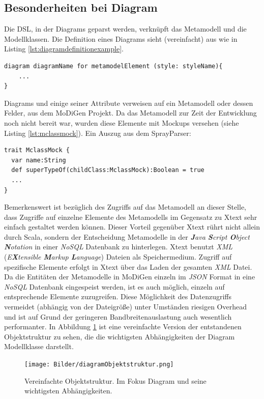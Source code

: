 \subsection{Besonderheiten bei Diagram}
Die DSL, in der Diagrams geparst werden, verknüpft das Metamodell und die Modellklassen. Die Definition eines Diagrams sieht (vereinfacht) aus wie in Listing \ref{lst:diagramdefinitionexample}.
\begin{lstlisting}[style=spray, caption = {Beispielhafte Diagram Definition (vereinfacht)}, label = {lst:diagramdefinitionexample}]
diagram diagramName for metamodelElement (style: styleName){
	...
}
\end{lstlisting}Diagrams und einige seiner Attribute verweisen auf ein Metamodell oder dessen Felder, aus dem MoDiGen Projekt.
Da das Metamodell zur Zeit der Entwicklung noch nicht bereit war, wurden diese Elemente mit Mockups versehen (siehe Listing \ref{lst:mclassmock}).
Ein Auszug aus dem SprayParser:
\begin{lstlisting}[style=scala, caption = {Auszug aus Code MclassMock über dass eigentliche MClass Elemente gemockt werden}, label = {lst:mclassmock}]
trait MclassMock {
  var name:String
  def superTypeOf(childClass:MclassMock):Boolean = true
  ...
}
\end{lstlisting}Bemerkenswert ist bezüglich des Zugriffs auf das Metamodell an dieser Stelle, dass Zugriffe auf einzelne Elemente des Metamodells im Gegensatz zu Xtext sehr einfach gestaltet werden können. Dieser Vorteil gegenüber Xtext rührt nicht allein durch Scala, sondern der Entscheidung Metamodelle in der \textit{\textbf{J}ava \textbf{S}cript \textbf{O}bject \textbf{N}otation} in einer \textit{NoSQL} Datenbank zu hinterlegen. Xtext benutzt \textit{XML} (\textit{E\textbf{X}tensible \textbf{M}arkup \textbf{L}anguage}) Dateien als Speichermedium. Zugriff auf spezifische Elemente erfolgt in Xtext über das Laden der gesamten \textit{XML} Datei. Da die Entitäten der Metamodelle in MoDiGen einzeln im \textit{JSON} Format in eine \textit{NoSQL} Datenbank eingespeist werden, ist es auch möglich, einzeln auf entsprechende Elemente zuzugreifen. Diese Möglichkeit des Datenzugriffs vermeidet (abhängig von der Dateigröße) unter Umständen riesigen Overhead und ist auf Grund der geringeren Bandbreitenauslastung auch wesentlich performanter. In Abbildung \ref{objectstructureDiagram} ist eine vereinfachte Version der entstandenen Objektstruktur zu sehen, die die wichtigsten Abhängigkeiten der Diagram Modellklasse darstellt.
\begin{figure}[H]
\begin{center}
\texttt{[image: Bilder/diagramObjektstruktur.png]}
\caption{Vereinfachte Objektstruktur. Im Fokus Diagram und seine wichtigsten Abhängigkeiten.}
\label{objectstructureDiagram}
\end{center}
\end{figure}
